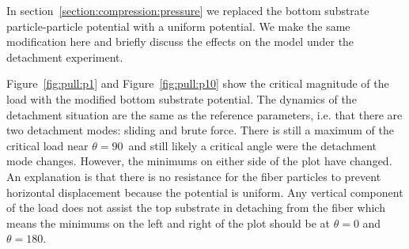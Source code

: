 In section~\ref{section:compression:pressure} we replaced the bottom substrate particle-particle potential with a uniform potential. We make the same modification here and briefly discuss the effects on the model under the detachment experiment.

Figure~\ref{fig:pull:p1} and Figure~\ref{fig:pull:p10} show the critical magnitude of the load with the modified bottom substrate potential. The dynamics of the detachment situation are the same as the reference parameters, i.e. that there are two detachment modes: sliding and brute force. There is still a maximum of the critical load near $\theta=90$\textdegree ~and still likely a critical angle were the detachment mode changes. However, the minimums on either side of the plot have changed. An explanation is that there is no resistance for the fiber particles to prevent horizontal displacement because the potential is uniform. Any vertical component of the load does not assist the top substrate in detaching from the fiber which means the minimums on the left and right of the plot should be at $\theta=0$ and $\theta=180$.

